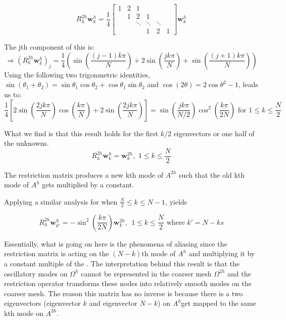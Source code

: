\documentclass[pdftex,12pt,a4paper]{article}
\begin{document}
\begin{equation}
R_h^{2h} \mathbf{w}_k^h = \frac 1 4 \begin{bmatrix}1 & 2 & 1 \\ & 1 & 2 & 1 \\ & & \ddots & \ddots & \ddots \\ & & & 1 & 2 & 1 \end{bmatrix} \mathbf{w}_k^h  
\end{equation}

The jth component of this is:  
\begin{equation}
\Rightarrow \left( R_h^{2h} \mathbf{w}_k^h \right)_j = 
\frac 1 4 \left(\sin\left(\frac{(j-1)k \pi}{N} \right) + 2 \sin\left(\frac{jk \pi}{N} \right)  + \sin\left(\frac{(j+1) k \pi}{N} \right)  \right)
\end{equation}
Using the following two trigonmetric identities, $\sin(\theta_1 + \theta_2) = \sin \theta_1 \cos\theta_2 + \cos\theta_1\sin\theta_2$ and $\cos(2 \theta) = 2 \cos \theta^2 -1$, leads us to: 
$$
\frac 1 4 \left[ 2 \sin\left(\frac{2jk\pi}{N} \right) \cos\left( \frac{k\pi}{N}\right)  + 2 \sin \left( \frac{2jk \pi}{N} \right) \right] =  \sin \left( \frac{jk \pi }{N / 2}\right) \cos^2 \left( \frac{k \pi}{2N} \right) \text{ for } 1 \leq k \leq \frac N 2 $$

What we find is that this result holds for the first $k/2$ eigenvectors or one half of the unknowns.  
\begin{equation}
R_h^{2h} \mathbf{w}_k^h = \mathbf{w}_k^{2h}, \, \,  1 \leq k \leq \frac N 2 
\end{equation}

The restriction matrix produces a new kth mode of $A^{2h}$ such that the old kth mode of $A^h$ gets multiplied by a constant.  

Applying a similar analysis for when $ \frac N 2 \leq k \leq N -1$, yields

$$
R_h^{2h} \mathbf{w}_{k'}^h = - \sin^2 \left( \frac{k \pi}{2N} \right) \mathbf{w}_k^{2h}, ~~ 1 \leq k \leq \frac N 2 \text{ where } k' = N-ks
$$ 

Essentially, what is going on here is the phenomena of aliasing since the restriction matrix is acting on the $(N-k)$th mode of $A^h$ and multiplying it by a constant multiple of the .  The interpretation behind this result is that the oscillatory modes on $\Omega^h$ cannot be represented in the coarser mesh $\Omega^{2h}$ and the restriction operator transforms these nodes into relatively smooth modes on the coarser mesh.  The reason this matrix has no inverse is because there is a two eigenvectors (eigenvector $k$ and eigenvector $N-k$) on $A^h$get mapped to the same kth mode on $A^{2h}$.
\end{document}
